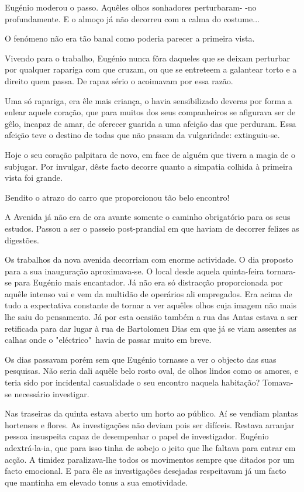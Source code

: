 \documentclass[9pt]{article}
\begin{document}
Eugé\-nio moderou o passo. Aquêles o\-lhos sonhadores perturbaram- -no %
profundamente. E o almoço  já não decorreu com a calma do costume...

O fenómeno não era tão banal como
poderia parecer a primeira vista.

Vivendo para o traba\-lho, Eugé\-nio
nunca fôra daqueles que se deixam perturbar por qualquer rapariga com que
cruzam, ou que se entreteem a galantear
torto e a direito quem passa. De rapaz sério o acoimavam por essa razão.

Uma só rapariga, era êle mais crian\-ça, o havia sensibilizado deveras
por forma a enlear aquele cora\-ção,
que para muitos dos seus companheiros
se afigurava ser de gêlo, incapaz de
amar, de oferecer guarida a uma afei\-ção
das que perduram. Essa afei\-ção teve o
destino de todas que não passam da vulgaridade: extinguiu-se.

Hoje o seu cora\-ção palpitara de
novo, em face de alguém que tivera
a magia de o subjugar. Por invulgar, dêste facto decorre quanto a simpatia co\-lhida à primeira vista foi gran\-de.

Bendito o atrazo do carro que proporcionou tão belo encontro!

A Avenida já não era de ora avante somente o caminho obrigatório para os seus estudos. Passou a ser o passeio post-prandial em que
haviam de decorrer felizes as digestões.

Os traba\-lhos da nova avenida decorriam com enorme actividade. O
dia proposto para a sua inaugura\-ção aproximava-se. O local desde aquela quinta-feira tornara-se para Eugé\-nio mais encantador. Já não era
só distrac\-ção proporcionada por a\-quê\-le intenso vai e vem da multidão
de operários ali empregados. Era acima de tudo a expectativa constante de tornar a ver a\-quê\-les o\-lhos cuja imagem não mais lhe saiu do
pensamento. Já por esta ocasião também a rua das Antas estava a ser
retifi\-cada para dar lugar à rua de Bartolomeu Dias em que já se viam
assentes as ca\-lhas onde o "eléctrico"\ havia de passar muito em breve.

Os dias passavam porém sem que Eugé\-nio tornasse a ver o objecto
das suas pesquisas. Não seria dali a\-quê\-le belo rosto oval, de o\-lhos lindos como os amores, e teria sido por incidental casualidade o seu encontro naquela habita\-ção? Tomava-se necessário investigar.

Nas traseiras da quinta estava aberto um horto ao público. Aí
se vendiam plantas hortenses e flores. As investiga\-ções não deviam
pois ser difíceis. Restava arranjar pessoa insuspeita capaz de desempenhar
o papel de investigador. Eugé\-nio adextrá-la-ia, que para isso tinha
de sobejo o jeito que lhe faltava para entrar em ac\-ção. A timidez paraliza\-\mbox{va-lhe} todos os movimentos sempre que ditados por um facto emocional. E para êle as investiga\-ções desejadas respeitavam já um
facto que mantinha em elevado tonus a sua emotividade.
\end{document}
